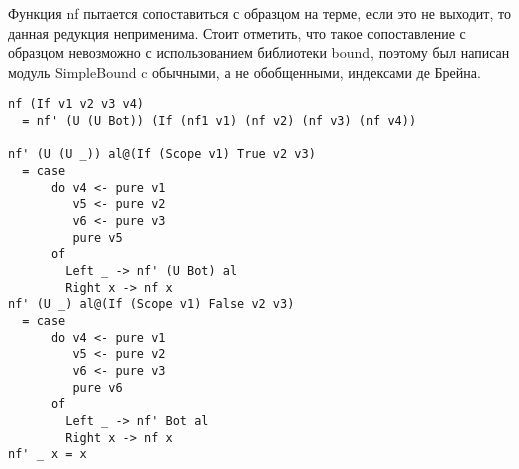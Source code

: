 Функция nf пытается сопоставиться с образцом на терме, если это не выходит, то данная редукция неприменима. Стоит отметить, что такое сопоставление с образцом невозможно с использованием библиотеки bound\cite{bound}, поэтому был написан модуль SimpleBound c обычными, а не обобщенными, индексами де Брейна.


\begin{lstlisting}[caption={Приведение в нормальную форму пытается применить все редукции данного функционального символа},captionpos=b, frame=single, float, floatplacement=H]
nf (If v1 v2 v3 v4)
  = nf' (U (U Bot)) (If (nf1 v1) (nf v2) (nf v3) (nf v4))

nf' (U (U _)) al@(If (Scope v1) True v2 v3)
  = case
      do v4 <- pure v1
         v5 <- pure v2
         v6 <- pure v3
         pure v5
      of
        Left _ -> nf' (U Bot) al
        Right x -> nf x
nf' (U _) al@(If (Scope v1) False v2 v3)
  = case
      do v4 <- pure v1
         v5 <- pure v2
         v6 <- pure v3
         pure v6
      of
        Left _ -> nf' Bot al
        Right x -> nf x
nf' _ x = x
\end{lstlisting}
